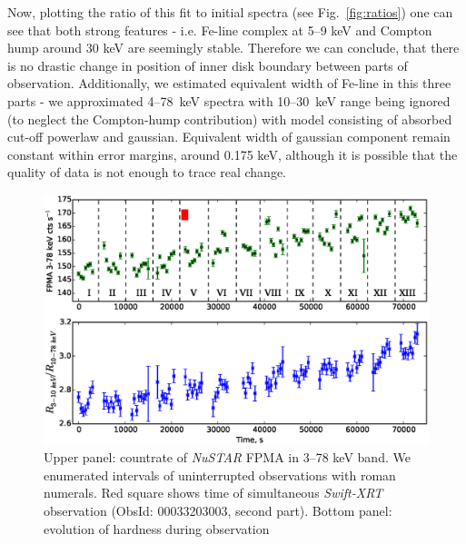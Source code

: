 \documentclass[a4paper,fleqn,usenatbib]{mnras}
\def\swiftx{{\em Swift-XRT\,}}
\def\nustar{{\em NuSTAR\,}}
\begin{document}
Now, plotting the ratio of this fit to initial spectra (see Fig.~\ref{fig:ratios}) one can see that both strong features - i.e. Fe-line complex at 5--9 keV and Compton hump around 30 keV are seemingly stable. Therefore we can conclude, that there is no drastic change in position of inner disk boundary between parts of observation. Additionally, we estimated equivalent width of Fe-line in this three parts - we approximated 4--78~keV spectra with 10--30~keV range being ignored (to neglect the Compton-hump contribution) with model consisting of absorbed cut-off powerlaw and gaussian. Equivalent width of gaussian component remain constant within error margins, around 0.175 keV, although it is possible that the quality of data is not enough to trace real change.

\begin{figure}
\centerline{\includegraphics[scale=0.7]{nuAlc_color_v04.eps}}
\caption{Upper panel: countrate of \nustar\,FPMA in 3--78 keV band. We enumerated intervals of uninterrupted observations with roman numerals. Red square shows time of simultaneous \swiftx observation (ObsId: 00033203003, second part). Bottom panel: evolution of hardness during observation} 
\label{fig:nust_lc}
\end{figure} 
\end{document}
